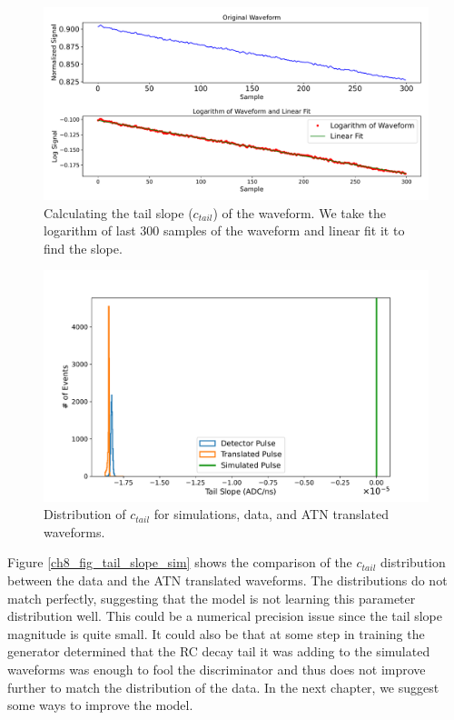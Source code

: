 \begin{figure}%
    \centering
    \includegraphics[width=0.99\linewidth, trim={0.4cm 0pc 0.3cm 0cm},clip]{ch8/figs/tail_slope_calc.pdf}
    \caption{Calculating the tail slope ($c_{tail}$) of the waveform. We take the logarithm of last 300 samples of the waveform and linear fit it to find the slope.}
    \label{ch8_fig_tail_slope_calc}
\end{figure}

\begin{figure}%
\centering
\includegraphics[width=0.9\linewidth,trim={2pc 0pc 2pc 0pc},clip]{ch8/figs/SEP_ts_with_sim.pdf}
\caption{Distribution of $c_{tail}$ for simulations, data, and ATN translated waveforms.}
\label{ch8_fig_tail_slope_comp}
\end{figure}

Figure \ref{ch8_fig_tail_slope_sim} shows the comparison of the $c_{tail}$ distribution between the data and the ATN translated waveforms. The distributions do not match perfectly, suggesting that the model is not learning this parameter distribution well. This could be a numerical precision issue since the tail slope magnitude is quite small. It could also be that at some step in training the generator determined that the RC decay tail it was adding to the simulated waveforms was enough to fool the discriminator and thus does not improve further to match the distribution of the data. In the next chapter, we suggest some ways to improve the model.

